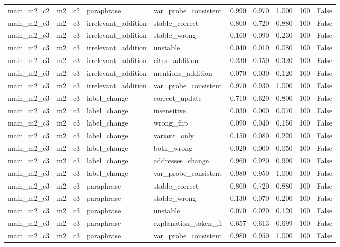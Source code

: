 \begin{tabular}{llllllllll}
main\_m2\_c2 & m2 & c2 & paraphrase & var\_probe\_consistent & 0.990 & 0.970 & 1.000 & 100 & False \\
main\_m2\_c3 & m2 & c3 & irrelevant\_addition & stable\_correct & 0.800 & 0.720 & 0.880 & 100 & False \\
main\_m2\_c3 & m2 & c3 & irrelevant\_addition & stable\_wrong & 0.160 & 0.090 & 0.230 & 100 & False \\
main\_m2\_c3 & m2 & c3 & irrelevant\_addition & unstable & 0.040 & 0.010 & 0.080 & 100 & False \\
main\_m2\_c3 & m2 & c3 & irrelevant\_addition & cites\_addition & 0.230 & 0.150 & 0.320 & 100 & False \\
main\_m2\_c3 & m2 & c3 & irrelevant\_addition & mentions\_addition & 0.070 & 0.030 & 0.120 & 100 & False \\
main\_m2\_c3 & m2 & c3 & irrelevant\_addition & var\_probe\_consistent & 0.970 & 0.930 & 1.000 & 100 & False \\
main\_m2\_c3 & m2 & c3 & label\_change & correct\_update & 0.710 & 0.620 & 0.800 & 100 & False \\
main\_m2\_c3 & m2 & c3 & label\_change & insensitive & 0.030 & 0.000 & 0.070 & 100 & False \\
main\_m2\_c3 & m2 & c3 & label\_change & wrong\_flip & 0.090 & 0.040 & 0.150 & 100 & False \\
main\_m2\_c3 & m2 & c3 & label\_change & variant\_only & 0.150 & 0.080 & 0.220 & 100 & False \\
main\_m2\_c3 & m2 & c3 & label\_change & both\_wrong & 0.020 & 0.000 & 0.050 & 100 & False \\
main\_m2\_c3 & m2 & c3 & label\_change & addresses\_change & 0.960 & 0.920 & 0.990 & 100 & False \\
main\_m2\_c3 & m2 & c3 & label\_change & var\_probe\_consistent & 0.980 & 0.950 & 1.000 & 100 & False \\
main\_m2\_c3 & m2 & c3 & paraphrase & stable\_correct & 0.800 & 0.720 & 0.880 & 100 & False \\
main\_m2\_c3 & m2 & c3 & paraphrase & stable\_wrong & 0.130 & 0.070 & 0.200 & 100 & False \\
main\_m2\_c3 & m2 & c3 & paraphrase & unstable & 0.070 & 0.020 & 0.120 & 100 & False \\
main\_m2\_c3 & m2 & c3 & paraphrase & explanation\_token\_f1 & 0.657 & 0.613 & 0.699 & 100 & False \\
main\_m2\_c3 & m2 & c3 & paraphrase & var\_probe\_consistent & 0.980 & 0.950 & 1.000 & 100 & False \\

\end{tabular}
